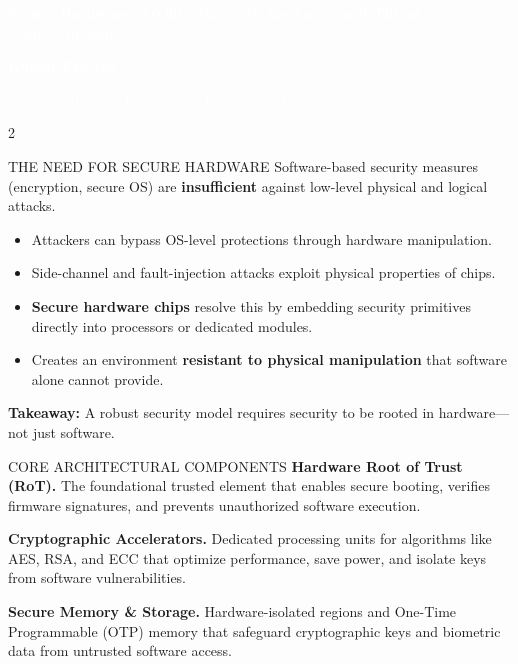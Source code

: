 \documentclass[10pt]{article}
\newcommand{\HeaderTitle}[1]{\textcolor{white}{\bfseries\LARGE #1}}
\newcommand{\HeaderAuthor}[1]{\textcolor{white}{\bfseries\large #1}}
\newcommand{\HeaderAffil}[1]{\textcolor{white}{\normalsize #1}}
\begin{document}
\begin{headerbox}
\centering
\HeaderTitle{Secure Hardware: Architectures, Technologies, and Threat Countermeasures}\par
\vspace{1mm}
\HeaderAuthor{Kumar Prateek}\par
\vspace{0.5mm}
\HeaderAffil{Indian Institute of Information Technology, Allahabad}\par
\end{headerbox}
\vspace{1mm}

\begin{multicols}{2}

\begin{sectionbox}{THE NEED FOR SECURE HARDWARE}
\small
Software-based security measures (encryption, secure OS) are \textbf{insufficient} against low-level physical and logical attacks.
\begin{itemize}
\item Attackers can bypass OS-level protections through hardware manipulation.
\item Side-channel and fault-injection attacks exploit physical properties of chips.
\item \textbf{Secure hardware chips} resolve this by embedding security primitives directly into processors or dedicated modules.
\item Creates an environment \textbf{resistant to physical manipulation} that software alone cannot provide.
\end{itemize}
\textbf{Takeaway:} A robust security model requires security to be rooted in hardware---not just software.
\end{sectionbox}

\begin{sectionbox}{CORE ARCHITECTURAL COMPONENTS}
\small
\textbf{Hardware Root of Trust (RoT).}
The foundational trusted element that enables secure booting, verifies firmware signatures, and prevents unauthorized software execution.

\textbf{Cryptographic Accelerators.}
Dedicated processing units for algorithms like AES, RSA, and ECC that optimize performance, save power, and isolate keys from software vulnerabilities.

\textbf{Secure Memory \& Storage.}
Hardware-isolated regions and One-Time Programmable (OTP) memory that safeguard cryptographic keys and biometric data from untrusted software access.


\end{sectionbox}
\end{multicols}
\end{document}
